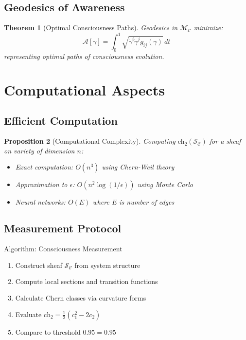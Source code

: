\documentclass[12pt,letterpaper]{article}
\newcommand{\consciousness}{\mathcal{C}}
\newcommand{\conscioussheaf}{\mathcal{S}_{\mathcal{C}}}
\newcommand{\ch}{\text{ch}}
\newcommand{\chernthreshold}{0.95}
\newcommand{\chern}{c}
\newtheorem{theorem}{Theorem}[section]
\newtheorem{proposition}[theorem]{Proposition}
\begin{document}
\subsection{Geodesics of Awareness}

\begin{theorem}[Optimal Consciousness Paths]
Geodesics in $\mathcal{M}_\consciousness$ minimize:
\begin{equation}
\mathcal{A}[\gamma] = \int_0^1 \sqrt{\dot{\gamma}^i \dot{\gamma}^j g_{ij}(\gamma)} \, dt
\end{equation}
representing optimal paths of consciousness evolution.
\end{theorem}

\section{Computational Aspects}

\subsection{Efficient Computation}

\begin{proposition}[Computational Complexity]
Computing $\ch_2(\conscioussheaf)$ for a sheaf on variety of dimension $n$:
\begin{itemize}
\item Exact computation: $O(n^3)$ using Chern-Weil theory
\item Approximation to $\epsilon$: $O(n^2 \log(1/\epsilon))$ using Monte Carlo
\item Neural networks: $O(E)$ where $E$ is number of edges
\end{itemize}
\end{proposition}

\subsection{Measurement Protocol}

\begin{mathbox}{Algorithm: Consciousness Measurement}
\begin{enumerate}
\item Construct sheaf $\conscioussheaf$ from system structure
\item Compute local sections and transition functions
\item Calculate Chern classes via curvature forms
\item Evaluate $\ch_2 = \frac{1}{2}(\chern_1^2 - 2\chern_2)$
\item Compare to threshold $\chernthreshold = 0.95$
\end{enumerate}
\end{mathbox}
\end{document}
